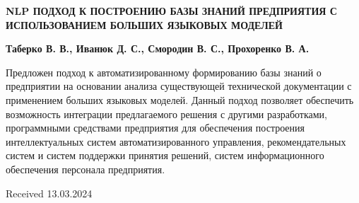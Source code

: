\documentclass[11pt,final]{article}
\begin{document}
\begin{multicols}{2}
        \columnbreak
            
        \begin{minipage}{0.4\textwidth}
            \begin{center}
                {\normalsize{\textbf{NLP ПОДХОД К ПОСТРОЕНИЮ БАЗЫ ЗНАНИЙ ПРЕДПРИЯТИЯ С ИСПОЛЬЗОВАНИЕМ БОЛЬШИХ ЯЗЫКОВЫХ МОДЕЛЕЙ }}}
            \end{center}
            \begin{center}
                {\small\textbf{Таберко В. В., Иванюк Д. С.,
                Смородин В. С., Прохоренко В. А.}}
            \end{center}

        Предложен подход к автоматизированному формированию базы знаний о предприятии на основании анализа существующей технической документации с применением больших языковых моделей. Данный подход позволяет обеспечить возможность интеграции предлагаемого решения с другими разработками, программными средствами предприятия для обеспечения построения интеллектуальных систем автоматизированного управления, рекомендательных систем и систем поддержки принятия решений, систем информационного обеспечения персонала предприятия.

        \begin{flushright}
            Received 13.03.2024
        \end{flushright}

        \end{minipage}
    \end{multicols}
\end{document}
